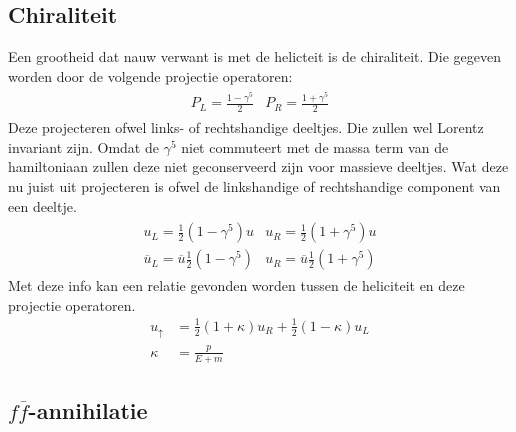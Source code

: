 \documentclass[../main.tex]{subfiles}
\begin{document}
\subsection{Chiraliteit}%
\label{sub:chiraliteit}

Een grootheid dat nauw verwant is met de helicteit is de chiraliteit. Die gegeven worden door de volgende projectie operatoren:
\begin{equation}
    \begin{aligned}
        \label{eq:chiraliteit_operatoren}
        \begin{matrix}
            P_L = \frac{1-\gamma^5}{2} & P_R = \frac{1+\gamma^5}{2}
        \end{matrix}
    \end{aligned}
\end{equation}
Deze projecteren ofwel links- of rechtshandige deeltjes. Die zullen wel Lorentz invariant zijn. Omdat de $\gamma^5$ niet commuteert met de massa term van de hamiltoniaan zullen deze niet geconserveerd zijn voor massieve deeltjes. Wat deze nu juist uit projecteren is ofwel de linkshandige of rechtshandige component van een deeltje.
\begin{equation}
    \begin{aligned}
        \label{eq:proj_deeltjes}
        \begin{matrix}
            u_L = \frac{1}{2} (1-\gamma^5)u & u_R = \frac{1}{2} (1+\gamma^5)u\\
            \overline u_L = \overline u\frac{1}{2} (1-\gamma^5) & u_R = \overline u\frac{1}{2} (1+\gamma^5)
        \end{matrix}
    \end{aligned}
\end{equation}
Met deze info kan een relatie gevonden worden tussen de heliciteit en deze projectie operatoren.
\begin{equation}
    \begin{aligned}
        \label{eq:hel_chir}
        u_\uparrow &= \frac{1}{2} (1+\kappa)u_R + \frac{1}{2} (1-\kappa)u_L\\
        \kappa &= \frac{p}{E+m} 
    \end{aligned}
\end{equation}

\subsection{$f\overline f$-annihilatie}%
\label{sub:_foverline_f_annihilatie}
\end{document}
